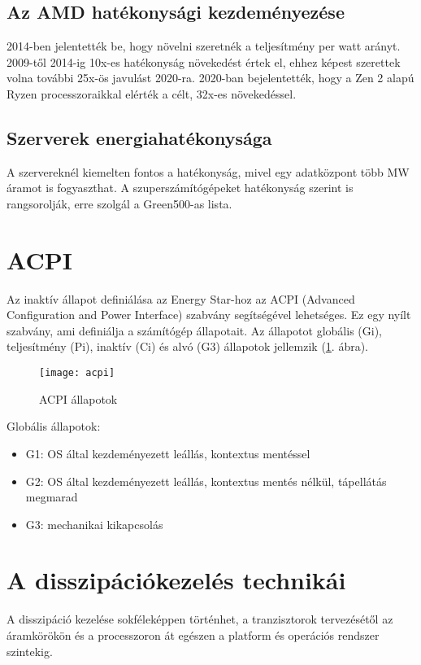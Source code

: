 \subsection{Az AMD hatékonysági kezdeményezése}
2014-ben jelentették be, hogy növelni szeretnék a teljesítmény per watt arányt.
2009-től 2014-ig 10x-es hatékonyság növekedést értek el, ehhez képest szerettek volna további 25x-ös javulást 2020-ra.
2020-ban bejelentették, hogy a Zen 2 alapú Ryzen processzoraikkal elérték a célt, 32x-es növekedéssel.

\subsection{Szerverek energiahatékonysága}
A szervereknél kiemelten fontos a hatékonyság, mivel egy adatközpont több MW áramot is fogyaszthat.
A szuperszámítógépeket hatékonyság szerint is rangsorolják, erre szolgál a Green500-as lista.

\section{ACPI}
Az inaktív állapot definiálása az Energy Star-hoz az ACPI (Advanced Configuration and Power Interface) szabvány segítségével lehetséges.
Ez egy nyílt szabvány, ami definiálja a számítógép állapotait.
Az állapotot globális (Gi), teljesítmény (Pi), inaktív (Ci) és alvó (G3) állapotok jellemzik (\ref{fig:acpi}. ábra).
\begin{figure}[H]
    \texttt{[image: acpi]}
    \centering
    \caption{ACPI állapotok}
    \label{fig:acpi}
\end{figure}

Globális állapotok:
\begin{itemize}
    \item G1: OS által kezdeményezett leállás, kontextus mentéssel
    \item G2: OS által kezdeményezett leállás, kontextus mentés nélkül, tápellátás megmarad
    \item G3: mechanikai kikapcsolás
\end{itemize}

\section{A disszipációkezelés technikái}
A disszipáció kezelése sokféleképpen történhet, a tranzisztorok tervezésétől az áramkörökön és a processzoron át egészen a platform és operációs rendszer szintekig.

